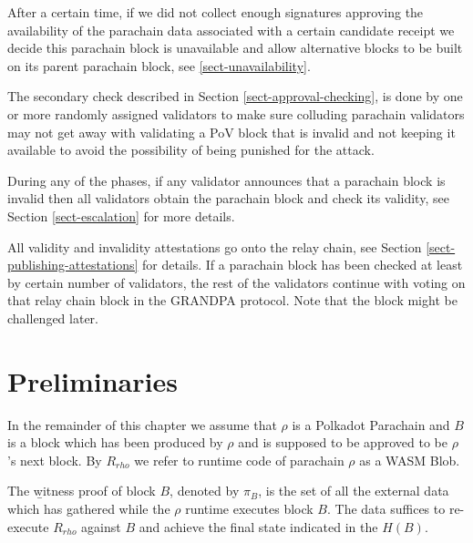 After a certain time, if we did not collect enough signatures approving the availability of the parachain data associated with a certain candidate receipt we decide this parachain block is unavailable and allow alternative blocks to be built on its parent parachain block, see \ref{sect-unavailability}.
\newline

The secondary check described in Section \ref{sect-approval-checking}, is done by one or more randomly assigned validators to make sure colluding parachain validators may not get away with validating a PoV block that is invalid and not keeping it available to avoid the possibility of being punished for the attack.
\newline

During any of the phases, if any validator announces that a parachain block is invalid then all validators obtain the parachain block and check its validity, see Section \ref{sect-escalation} for more details.
\newline

All validity and invalidity attestations go onto the relay chain, see Section \ref{sect-publishing-attestations} for details. If a parachain block has been checked at least by certain number of validators, the rest of the validators continue with voting on that relay chain block in the GRANDPA protocol. Note that the block might be challenged later.
\newline

\section{Preliminaries}

\begin{definition}
In the remainder of this chapter we assume that $\rho$ is a Polkadot Parachain and $B$ is a block which has been produced by $\rho$ and is supposed to be approved to be $\rho$'s next block. By $R_{rho}$ we refer to runtime code of parachain $\rho$  as a WASM Blob.
\end{definition}

\begin{definition}
  \label{defn-witness-proof}
  The {\b witness proof} of block $B$, denoted by {\bf $\pi_B$}, is the set of all the external data which has gathered while the $\rho$ runtime executes block $B$. The data suffices to re-execute $R_{rho}$ against $B$ and achieve the final state indicated in the $H(B)$.
\end{definition}

